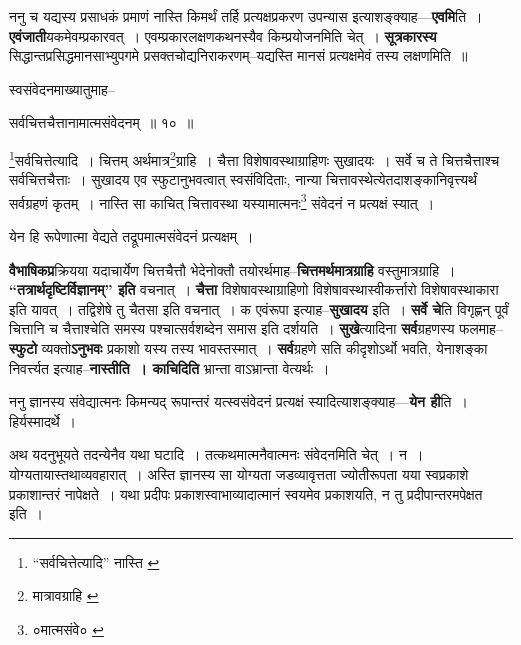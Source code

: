 \documentclass[article,12pt,a4paper]{memoir}
\begin{document}
	  \pstart ननु च यद्यस्य प्रसाधकं प्रमाणं नास्ति किमर्थं तर्हि प्रत्यक्षप्रकरण उपन्यास इत्याशङ्क्याह—\textbf{एवमि}ति । \textbf{एवंजाती}यकमेवम्प्रकारवत् । एवम्प्रकारलक्षणकथनस्यैव किम्प्रयोजनमिति चेत् । \textbf{सूत्रकारस्य} सिद्धान्तप्रसिद्धमानसाभ्युपगमे प्रसक्तचोद्यनिराकरणम्--यद्यस्ति मानसं प्रत्यक्षमेवं तस्य लक्षणमिति ॥
	\pend
      \leavevmode{}
	  \bigskip
	  \begingroup
	

	  \pstart स्वसंवेदनमाख्यातुमाह--
	\pend
       
	  \bigskip
	  \begingroup
	

	  \pstart सर्वचित्तचैत्तानामात्मसंवेदनम् ॥ १० ॥
	\pend
      
	  \endgroup
	 

	  \pstart \footnote{“सर्वचित्तेत्यादि” नास्ति \cite{dp-msA} \cite{dp-msC}}सर्वचित्तेत्यादि । चित्तम् अर्थमात्र\footnote{मात्रावग्राहि \cite{dp-msC}}ग्राहि । चैत्ता विशेषावस्थाग्राहिणः सुखादयः । सर्वे च ते चित्तचैत्ताश्च सर्वचित्तचैत्ताः । सुखादय एव स्फुटानुभवत्वात् स्वसंविदिताः, नान्या चित्तावस्थेत्येतदाशङ्कानिवृत्त्यर्थं सर्वग्रहणं कृतम् । नास्ति सा काचित् चित्तावस्था यस्यामात्मनः\footnote{०मात्मसंवे० \cite{dp-msD}} संवेदनं न प्रत्यक्षं स्यात् ।
	\pend
       

	  \pstart येन हि रूपेणात्मा वेद्यते तद्रूपमात्मसंवेदनं प्रत्यक्षम् ।
	\pend
      
	  \endgroup
	

	  \pstart \textbf{वैभाषिकप्र}क्रियया यदाचार्येण चित्तचैत्तौ भेदेनोक्तौ तयोरर्थमाह--\textbf{चित्तमर्थमात्रग्राहि} वस्तुमात्रग्राहि । \textbf{“तत्रार्थदृष्टिर्विज्ञानम्” इति} वचनात् । \textbf{चैत्ता} विशेषावस्थाग्राहिणो विशेषावस्थास्वीकर्त्तारो विशेषावस्थाकारा इति यावत् । तद्विशेषे तु चैतसा इति वचनात् । क एवंरूपा इत्याह--\textbf{सुखादय} इति । \textbf{सर्वे चे}ति विगृह्णन् पूर्वं चित्तानि च चैत्ताश्चेति समस्य पश्चात्सर्वशब्देन समास इति दर्शयति । \textbf{सुखे}त्यादिना \textbf{सर्व}ग्रहणस्य फलमाह--\textbf{स्फुटो} व्यक्तो\textbf{ऽनुभवः} प्रकाशो यस्य तस्य भावस्तस्मात् । \textbf{सर्व}ग्रहणे सति कीदृशोऽर्थो भवति, येनाशङ्का निवर्त्त्यत इत्याह--\textbf{नास्तीति । काचिदिति} भ्रान्ता वाऽभ्रान्ता वेत्यर्थः ।
	\pend
      

	  \pstart ननु ज्ञानस्य संवेद्यात्मनः किमन्यद् रूपान्तरं यत्स्वसंवेदनं प्रत्यक्षं स्यादित्याशङ्क्याह—\textbf{येन ही}ति । हिर्यस्मादर्थे ।
	\pend
      

	  \pstart अथ यदनुभूयते तदन्येनैव यथा घटादि । तत्कथमात्मनैवात्मनः संवेदनमिति चेत् । न । योग्यतायास्तथाव्यवहारात् । अस्ति ज्ञानस्य सा योग्यता जडव्यावृत्तता ज्योतीरूपता यया स्वप्रकाशे प्रकाशान्तरं नापेक्षते । यथा प्रदीपः प्रकाशस्वाभाव्यादात्मानं स्वयमेव प्रकाशयति, न तु प्रदीपान्तरमपेक्षत इति ।
	\pend
      
\end{document}
